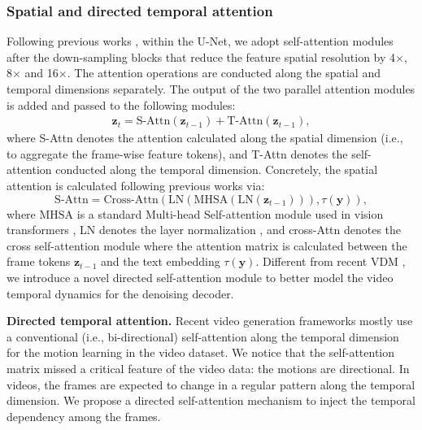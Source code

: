 \documentclass[10pt,twocolumn,letterpaper]{article}
\def\vy{{\bm{y}}}
\def\vz{{\bm{z}}}
\newcommand{\myPara}[1]{\vspace{6pt}\noindent\textbf{#1}}
\begin{document}
\subsubsection{Spatial and  directed temporal attention}
\label{subsubsec:temp_attn}
Following previous works \cite{dalle2, imagen, ho_video_2022}, within the U-Net, we adopt self-attention modules after the down-sampling blocks that reduce the feature spatial resolution  by 4$\times$, 8$\times$  and 16$\times$. The attention operations are conducted along the spatial and temporal dimensions separately. The output of the two parallel attention modules is added and passed to the following modules:
\begin{equation}
\begin{multlined}
    \bm{z}_t = \text{S-Attn}(\bm{z}_{t-1}) + \text{T-Attn}(\bm{z}_{t-1}),
\end{multlined}
\end{equation}
 where S-Attn denotes the attention calculated along the spatial dimension (i.e., to aggregate the frame-wise feature tokens), and T-Attn denotes the self-attention conducted along the temporal dimension. Concretely, the spatial attention is calculated following previous works \cite{imagen, dalle2} via:
\begin{equation}
\text{S-Attn} = \text{Cross-Attn}(\text{LN}(\text{MHSA}(\text{LN}(\bm{z}_{t-1}))), \tau(\vy) ),
\end{equation}
where $\text{MHSA}$ is a standard Multi-head  Self-attention module used in vision transformers \cite{dosovitskiy2020image, zhou2022understanding}, LN denotes the layer normalization \cite{ba2016layer}, and cross-Attn denotes the cross self-attention module where the attention matrix is calculated between the frame tokens $\vz_{t-1}$ and the text embedding $\tau(\vy)$. Different from recent VDM \cite{ho_video_2022}, 
we introduce a novel directed self-attention module to better model the video temporal dynamics for the denoising decoder. 


\myPara{Directed temporal attention.}
Recent video generation frameworks \cite{singer_make--video_2022, ho_video_2022} mostly use a conventional (i.e., bi-directional) self-attention along the temporal dimension for the motion learning in the video dataset. We notice that the self-attention matrix missed a critical feature of the video data: the motions are directional. In videos, the frames are expected to change in a regular pattern along the temporal dimension. We propose a directed self-attention mechanism to inject the temporal dependency among the frames.
\end{document}
